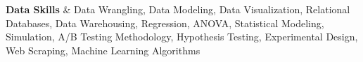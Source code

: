 \textbf{Data Skills} & 
Data Wrangling, 
Data Modeling, 
Data Visualization, 
Relational Databases, 
Data Warehousing, 
Regression, 
ANOVA, 
Statistical Modeling, 
Simulation, 
A/B Testing Methodology, 
Hypothesis Testing, 
Experimental Design, 
Web Scraping, 
Machine Learning Algorithms